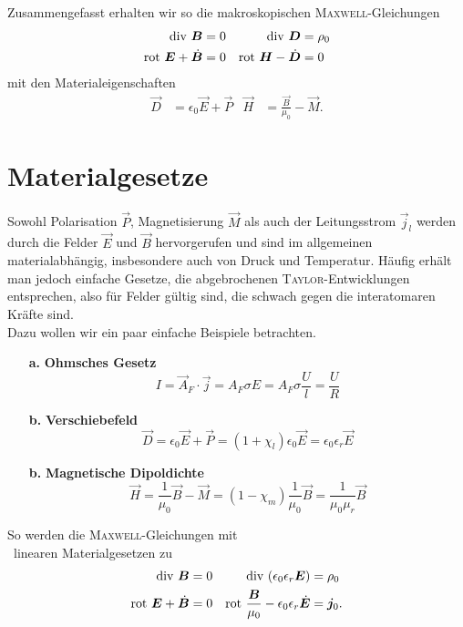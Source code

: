Zusammengefasst erhalten wir so die makroskopischen \textsc{Maxwell}-Gleichungen
\begin{align*}
\text{div }\bm{B} &=0 &\text{div }\bm{D} &= \rho_0\\
\text{rot } \bm{E} + \dot{\bm{B}} &= 0 &\text{rot } \bm{H}-\dot{\bm{D}}&=0
\end{align*}
mit den Materialeigenschaften
\begin{align*}
\vec{D}&=\epsilon_0\vec{E}+\vec{P} &\vec{H} &= \frac{\vec{B}}{\mu_0} -\vec{M}.
\end{align*}

\section{Materialgesetze}

Sowohl Polarisation $\vec{P}$, Magnetisierung $\vec{M}$ als auch der Leitungsstrom $\vec{j}_l$ werden durch die Felder $\vec{E}$ und $\vec{B}$ hervorgerufen und sind im allgemeinen materialabhängig, insbesondere auch von Druck und Temperatur. Häufig erhält man jedoch einfache Gesetze, die abgebrochenen \textsc{Taylor}-Entwicklungen entsprechen, also für Felder gültig sind, die schwach gegen die interatomaren Kräfte sind.\\
Dazu wollen wir ein paar einfache Beispiele betrachten.

\begin{enumerate}
	\item[\textbf{a.}] \textbf{Ohmsches Gesetz}
	\begin{equation*}
	I = \vec{A}_F\cdot\vec{j} = A_F\sigma E = A_F\sigma\frac{U}{l} = \frac{U}{R}
	\end{equation*}
	\item[\textbf{b.}] \textbf{Verschiebefeld}
	\begin{equation*}
	\vec{D}=\epsilon_0\vec{E}+\vec{P}=(1+\chi_l)\epsilon_0\vec{E}=\epsilon_0\epsilon_r \vec{E}
	\end{equation*}
	\item[\textbf{b.}] \textbf{Magnetische Dipoldichte}
	\begin{equation*}
	\vec{H} = \frac{1}{\mu_0}\vec{B}-\vec{M} = (1-\chi_m)\frac{1}{\mu_0}\vec{B}  = \frac{1}{\mu_0\mu_r}\vec{B}
	\end{equation*} 
\end{enumerate}

So werden die \textsc{Maxwell}-Gleichungen mit \\\
{linearen} Materialgesetzen zu
\begin{align*}
\text{div }\bm{B}&=0 &\text{div }(\epsilon_0\epsilon_r\bm{E})&=\rho_0\\
\text{rot } \bm{E}+\dot{\bm{B}}&=0 &\text{rot }\frac{\bm{B}}{\mu_0}-\epsilon_0\epsilon_r\dot{\bm{E}}&=\bm{j}_0.
\end{align*}

